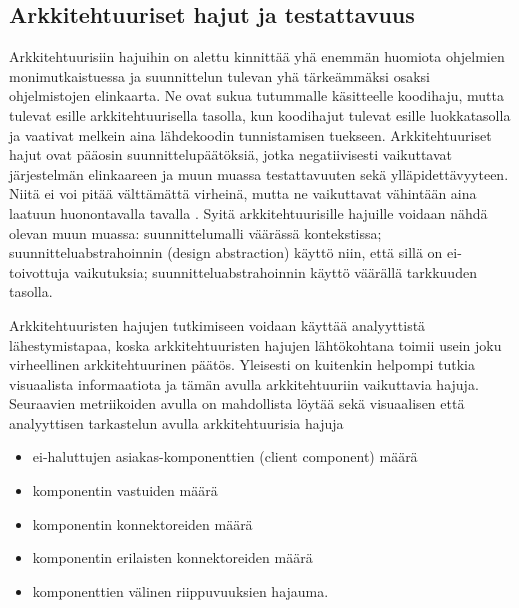 \documentclass[finnish]{tktltiki2}
\numberwithin{table}{section}
\theoremstyle{definition}
\theoremstyle{remark}
\begin{document}




\subsection{Arkkitehtuuriset hajut ja testattavuus} \label{arch_smells_and_testability}

Arkkitehtuurisiin hajuihin on alettu kinnittää yhä enemmän huomiota ohjelmien monimutkaistuessa ja suunnittelun tulevan yhä tärkeämmäksi osaksi ohjelmistojen elinkaarta. Ne ovat sukua tutummalle käsitteelle koodihaju, mutta tulevat esille arkkitehtuurisella tasolla, kun koodihajut tulevat esille luokkatasolla ja vaativat melkein aina lähdekoodin tunnistamisen tuekseen. Arkkitehtuuriset hajut ovat pääosin suunnittelupäätöksiä, jotka negatiivisesti vaikuttavat järjestelmän elinkaareen ja muun muassa testattavuuten sekä ylläpidettävyyteen. Niitä ei voi pitää välttämättä virheinä, mutta ne vaikuttavat vähintään aina laatuun huonontavalla tavalla \citep{de_andrade_architectural_2014}. Syitä arkkitehtuurisille hajuille voidaan nähdä olevan muun muassa: suunnittelumalli väärässä kontekstissa;  suunnitteluabstrahoinnin (design abstraction) käyttö niin, että sillä on ei-toivottuja vaikutuksia; suunnitteluabstrahoinnin käyttö väärällä tarkkuuden tasolla.

Arkkitehtuuristen hajujen tutkimiseen voidaan käyttää analyyttistä lähestymistapaa, koska arkkitehtuuristen hajujen lähtökohtana toimii usein joku virheellinen arkkitehtuurinen päätös. Yleisesti on kuitenkin helpompi tutkia visuaalista informaatiota ja tämän avulla arkkitehtuuriin vaikuttavia hajuja. Seuraavien metriikoiden avulla on mahdollista löytää sekä visuaalisen että analyyttisen tarkastelun avulla arkkitehtuurisia hajuja \citep{bertran_detecting_2011}

\begin{itemize}
	\item ei-haluttujen asiakas-komponenttien (client component) määrä
	\item komponentin vastuiden määrä
	\item komponentin konnektoreiden määrä
	\item komponentin erilaisten konnektoreiden määrä
	\item komponenttien välinen riippuvuuksien hajauma.
\end{itemize}
\end{document}
